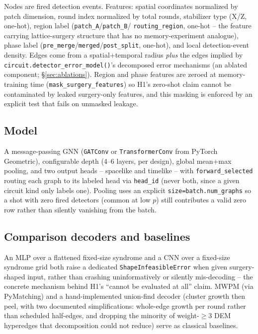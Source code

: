 \documentclass[11pt]{article}
\begin{document}
Nodes are fired detection events. Features: spatial coordinates normalized
by patch dimension, round index normalized by total rounds, stabilizer type
(X/Z, one-hot), region label (\texttt{patch\_A}/\texttt{patch\_B}/
\texttt{routing\_region}, one-hot -- the feature carrying lattice-surgery
structure that has no memory-experiment analogue), phase label
(\texttt{pre\_merge}/\texttt{merged}/\texttt{post\_split}, one-hot), and
local detection-event density. Edges come from a spatial+temporal radius
\emph{plus} the edges implied by \texttt{circuit.detector\_error\_model()}'s
decomposed error mechanisms (an ablated component; \S\ref{sec:ablations}).
Region and phase features are zeroed at memory-training time
(\texttt{mask\_surgery\_features}) so H1's zero-shot claim cannot be
contaminated by leaked surgery-only features, and this masking is enforced
by an explicit test that fails on unmasked leakage.

\subsection{Model}

A message-passing GNN (\texttt{GATConv} or \texttt{TransformerConv} from
PyTorch Geometric), configurable depth (4--6 layers, per design), global
mean+max pooling, and two output heads -- spacelike and timelike -- with
\texttt{forward\_selected} routing each graph to its labeled head via
\texttt{head\_id} (never both, since a given circuit kind only labels one).
Pooling uses an explicit \texttt{size=batch.num\_graphs} so a shot with zero
fired detectors (common at low $p$) still contributes a valid zero row
rather than silently vanishing from the batch.

\subsection{Comparison decoders and baselines}

An MLP over a flattened fixed-size syndrome and a CNN over a fixed-size
syndrome grid both raise a dedicated \texttt{ShapeInfeasibleError} when given
surgery-shaped input, rather than crashing uninformatively or silently
mis-decoding -- the concrete mechanism behind H1's ``cannot be evaluated at
all'' claim. MWPM (via PyMatching) and a hand-implemented union-find decoder
(cluster growth then peel, with two documented simplifications: whole-edge
growth per round rather than scheduled half-edges, and dropping the minority
of weight-$\geq 3$ DEM hyperedges that decomposition could not reduce) serve
as classical baselines.
\end{document}
